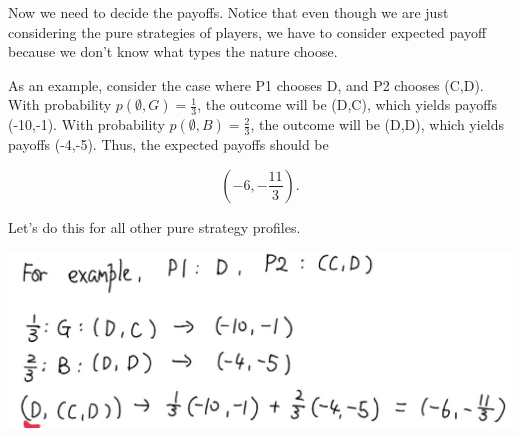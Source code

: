\documentclass[12pt, oneside]{article}
\begin{document}
Now we need to decide the payoffs. Notice that even though we are just considering the pure strategies of players, we have to consider expected payoff because we don’t know what types the nature choose.

As an example, consider the case where P1 chooses D, and P2 chooses (C,D). With probability \( p(\emptyset, G) = \frac{1}{3} \), the outcome will be (D,C), which yields payoffs (-10,-1). With probability \( p(\emptyset, B) = \frac{2}{3} \), the outcome will be (D,D), which yields payoffs (-4,-5). Thus, the expected payoffs should be 

\[
\left( -6, -\frac{11}{3} \right).
\]

Let's do this for all other pure strategy profiles.

\includegraphics{Figure/cpt_process1.png}
\end{document}
